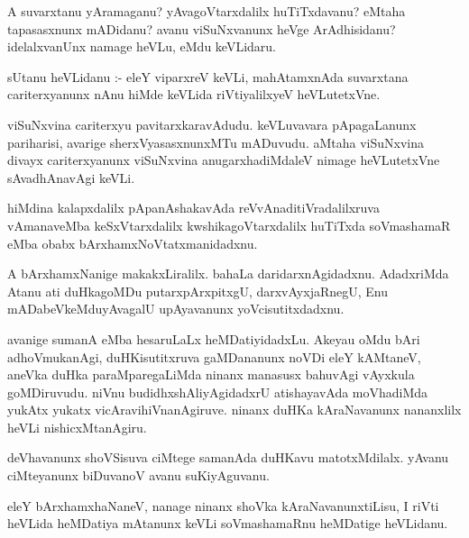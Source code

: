 \documentclass{article}
\begin{document}
\begin{mn}
A suvarxtanu yAramaganu? yAvagoVtarxdalilx huTiTxdavanu? eMtaha tapasasxnunx 
mADidanu? avanu viSuNxvanunx heVge ArAdhisidanu? idelalxvanUnx namage heVLu, 
eMdu keVLidaru.
\end{mn}

\begin{mn}
sUtanu heVLidanu :- eleY viparxreV keVLi,  mahAtamxnAda suvarxtana cariterxyanunx 
nAnu hiMde keVLida riVtiyalilxyeV heVLutetxVne. 
\end{mn}

\begin{mn}
viSuNxvina cariterxyu pavitarxkaravAdudu. keVLuvavara pApagaLanunx pariharisi,
 avarige sherxVyasasxnunxMTu mADuvudu. aMtaha viSuNxvina divayx cariterxyanunx 
 viSuNxvina anugarxhadiMdaleV nimage heVLutetxVne sAvadhAnavAgi keVLi. 
\end{mn}

\begin{mn}
hiMdina kalapxdalilx pApanAshakavAda reVvAnaditiVradalilxruva vAmanaveMba 
keSxVtarxdalilx kwshikagoVtarxdalilx huTiTxda soVmashamaR eMba obabx 
bArxhamxNoVtatxmanidadxnu.
\end{mn}

\begin{mn}
A bArxhamxNanige makakxLiralilx. bahaLa daridarxnAgidadxnu. AdadxriMda Atanu
 ati duHkagoMDu putarxpArxpitxgU, darxvAyxjaRnegU, Enu mADabeVkeMduyAvagalU 
 upAyavanunx yoVcisutitxdadxnu. 
\end{mn}

\begin{mn}
avanige sumanA eMba hesaruLaLx heMDatiyidadxLu. Akeyau oMdu bAri adhoVmukanAgi,
 duHKisutitxruva gaMDananunx noVDi eleY kAMtaneV, aneVka duHka paraMparegaLiMda 
 ninanx manasusx bahuvAgi vAyxkula goMDiruvudu. niVnu budidhxshAliyAgidadxrU 
 atishayavAda moVhadiMda yukAtx yukatx vicAravihiVnanAgiruve. ninanx duHKa 
 kAraNavanunx nananxlilx heVLi nishicxMtanAgiru. 
\end{mn}

\begin{mn}
deVhavanunx shoVSisuva ciMtege samanAda duHKavu matotxMdilalx. yAvanu 
ciMteyanunx biDuvanoV avanu suKiyAguvanu.
\end{mn}

\begin{mn}
eleY bArxhamxhaNaneV, nanage ninanx shoVka kAraNavanunxtiLisu, I riVti heVLida 
heMDatiya mAtanunx keVLi soVmashamaRnu heMDatige heVLidanu.
\end{mn}
\end{document}
